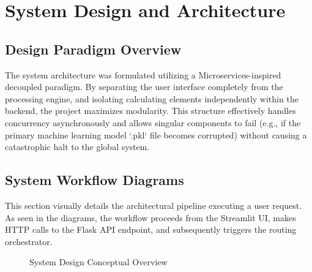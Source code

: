 \documentclass[12pt,a4paper]{report}
\begin{document}
\chapter{System Design and Architecture}

\section{Design Paradigm Overview}
The system architecture was formulated utilizing a Microservices-inspired decoupled paradigm. By separating the user interface completely from the processing engine, and isolating calculating elements independently within the backend, the project maximizes modularity. This structure effectively handles concurrency asynchronously and allows singular components to fail (e.g., if the primary machine learning model `.pkl` file becomes corrupted) without causing a catastrophic halt to the global system.

\section{System Workflow Diagrams}

This section visually details the architectural pipeline executing a user request. As seen in the diagrams, the workflow proceeds from the Streamlit UI, makes HTTP calls to the Flask API endpoint, and subsequently triggers the routing orchestrator.

\begin{figure}[h]
\centering
{}
\caption{System Design Conceptual Overview}
\label{fig:arch}
\end{figure}
\end{document}
